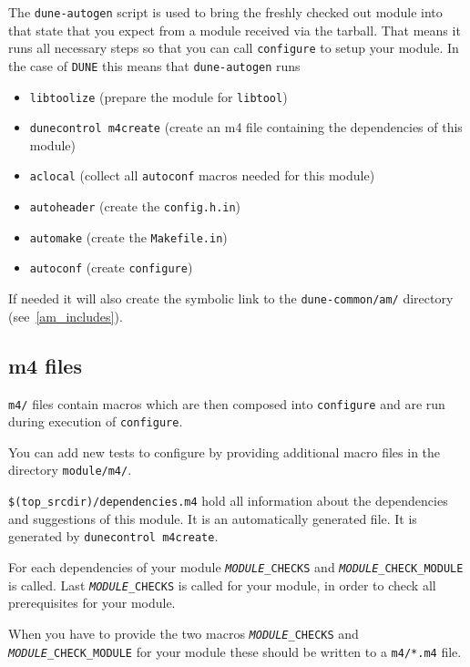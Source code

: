 \documentclass[11pt,a4paper,headinclude,footinclude,DIV16,normalheadings]{scrartcl}
\newcommand{\dune}{\texttt{DUNE}\xspace}
\newcommand{\autoconf}{\texttt{autoconf}\xspace}
\newcommand{\autogen}{\texttt{dune-autogen}\xspace}
\newcommand{\libtool}{\texttt{libtool}\xspace}
\newcommand{\configure}{\texttt{configure}\xspace}
\newcommand{\makefilein}{\texttt{Makefile.in}\xspace}
\newcommand{\topsrc}{\$(top\_srcdir)}
\begin{document}
The \autogen script is used to bring the freshly checked out module
into that state that you expect from a module received via the
tarball. That means it runs all necessary steps so that you can call
\configure to setup your module. In the case of \dune this means that
\autogen runs
\begin{itemize}
\item \texttt{libtoolize} (prepare the module for \libtool)
\item \texttt{dunecontrol m4create} (create an m4 file containing the
  dependencies of this module)
\item \texttt{aclocal} (collect all \autoconf macros needed for this module)
\item \texttt{autoheader} (create the \texttt{config.h.in})
\item \texttt{automake} (create the \makefilein)
\item \texttt{autoconf} (create \configure)
\end{itemize}

If needed it will also create the symbolic link to the
\texttt{dune-common/am/} directory (see~\ref{am_includes}).

\subsection{m4 files}
\label{m4files}

\texttt{m4/} files contain macros which are then composed into
\configure and are run during execution of \configure.


You can add new tests to configure by providing additional macro files
in the directory \texttt{module/m4/}.


\texttt{\topsrc/dependencies.m4} hold all information about the
dependencies and suggestions of this module. It is an automatically
generated file. It is generated by \texttt{dunecontrol m4create}.

For each dependencies of your module \texttt{\emph{MODULE}\_CHECKS}
and \texttt{\emph{MODULE}\_CHECK\_MODULE} is called. Last
\texttt{\emph{MODULE}\_CHECKS} is called for your module, in order to
check all prerequisites for your module.

When you have to provide the two macros
\texttt{\emph{MODULE}\_CHECKS} and
\texttt{\emph{MODULE}\_CHECK\_MODULE} for your module these should be
written to a \texttt{m4/*.m4} file.
\end{document}
